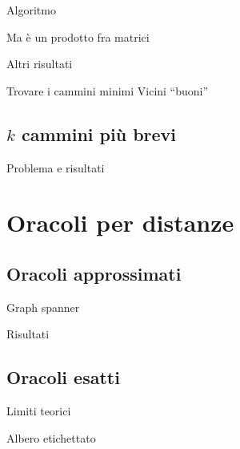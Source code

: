 \documentclass{beamer}
\theoremstyle{plain}
\theoremstyle{definition}
\theoremstyle{remark}
\begin{document}
\begin{frame}
  Algoritmo
\end{frame}

\begin{frame}
  Ma è un prodotto fra matrici
\end{frame}

\begin{frame}
  Altri risultati
\end{frame}

\begin{frame}{Trovare i cammini minimi}
  Vicini ``buoni''
\end{frame}


\subsection{$k$ cammini pi\`u brevi}

\begin{frame}
  Problema e risultati
\end{frame}


\section{Oracoli per distanze}

\subsection{Oracoli approssimati}

\begin{frame}{Graph spanner}
  
\end{frame}

\begin{frame}{Risultati}
  
\end{frame}

\subsection{Oracoli esatti}

\begin{frame}{Limiti teorici}
  
\end{frame}

\begin{frame}{Albero etichettato}
  
\end{frame}
\end{document}
